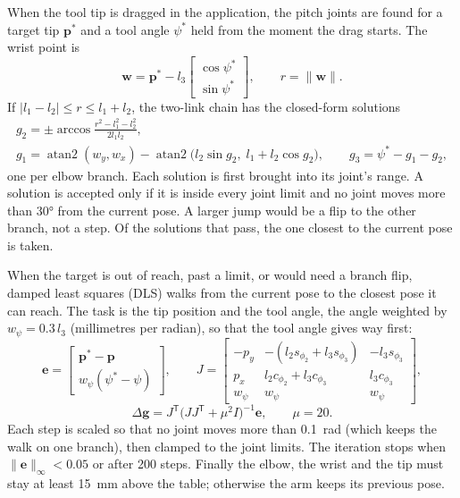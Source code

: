 \documentclass[11pt,a4paper]{article}
\begin{document}
When the tool tip is dragged in the application, the pitch joints are found for a target tip $\mathbf p^*$ and
a tool angle $\psi^*$ held from the moment the drag starts. The wrist point is
\begin{equation}
  \mathbf w=\mathbf p^*-l_3\begin{bmatrix}\cos\psi^*\\ \sin\psi^*\end{bmatrix},\qquad r=\lVert\mathbf w\rVert .
\end{equation}
If $|l_1-l_2|\le r\le l_1+l_2$, the two-link chain has the closed-form solutions
\begin{gather}
  g_2=\pm\arccos\frac{r^2-l_1^2-l_2^2}{2l_1l_2},\\
  g_1=\operatorname{atan2}(w_y,w_x)-\operatorname{atan2}\!\bigl(l_2\sin g_2,\;l_1+l_2\cos g_2\bigr),\qquad
  g_3=\psi^*-g_1-g_2 ,
\end{gather}
one per elbow branch. Each solution is first brought into its joint's range. A solution is accepted only if it
is inside every joint limit and no joint moves more than \ang{30} from the current pose. A larger jump would be
a flip to the other branch, not a step. Of the solutions that pass, the one closest to the current pose is
taken.

When the target is out of reach, past a limit, or would need a branch flip, damped least squares (DLS) walks
from the current pose to the closest pose it can reach. The task is the tip position and the tool angle, the
angle weighted by $w_\psi=0.3\,l_3$ (millimetres per radian), so that the tool angle gives way first:
\begin{equation}
  \mathbf e=\begin{bmatrix}\mathbf p^*-\mathbf p\\ w_\psi(\psi^*-\psi)\end{bmatrix},\qquad
  J=\begin{bmatrix}
    -p_y & -(l_2 s_{\phi_2}+l_3 s_{\phi_3}) & -l_3 s_{\phi_3}\\
    p_x & l_2 c_{\phi_2}+l_3 c_{\phi_3} & l_3 c_{\phi_3}\\
    w_\psi & w_\psi & w_\psi \end{bmatrix},
\end{equation}
\begin{equation}
  \Delta\mathbf g=J^{\mathsf T}\bigl(JJ^{\mathsf T}+\mu^2 I\bigr)^{-1}\mathbf e,\qquad \mu=20 .
\end{equation}
Each step is scaled so that no joint moves more than \SI{0.1}{\radian} (which keeps the walk on one branch),
then clamped to the joint limits. The iteration stops when $\lVert\mathbf e\rVert_\infty<0.05$ or after 200
steps. Finally the elbow, the wrist and the tip must stay at least \SI{15}{\milli\metre} above the table;
otherwise the arm keeps its previous pose.
\end{document}
